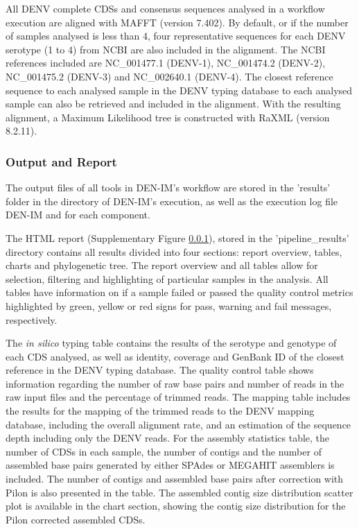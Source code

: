 All DENV complete CDSs and consensus sequences analysed in a workflow execution are aligned with MAFFT \citep{nakamura_parallelization_2018} (version 7.402). By default, or if the number of samples analysed is less than 4, four representative sequences for each DENV serotype (1 to 4) from NCBI are also included in the alignment. The NCBI references included are NC\_001477.1 (DENV-1), NC\_001474.2 (DENV-2), NC\_001475.2 (DENV-3) and NC\_002640.1 (DENV-4). The closest reference sequence to each analysed sample in the DENV typing database to each analysed sample can also be retrieved and included in the alignment. With the resulting alignment, a Maximum Likelihood tree is constructed with RaXML \citep{stamatakis_raxml_2014} (version 8.2.11). 

\subsubsection{Output and Report}

The output files of all tools in DEN-IM’s workflow are stored in the ’results’ folder in the directory of DEN-IM’s execution, as well as the execution log file DEN-IM and for each component. 

The HTML report (Supplementary Figure \ref{}), stored in the ’pipeline\_results’ directory contains all results divided into four sections: report overview, tables, charts and phylogenetic tree. The report overview and all tables allow for selection, filtering and highlighting of particular samples in the analysis. All tables have information on if a sample failed or passed the quality control metrics highlighted by green, yellow or red signs for pass, warning and fail messages, respectively. 

The \textit{in silico} typing table contains the results of the serotype and genotype of each CDS analysed, as well as identity, coverage and GenBank ID of the closest reference in the DENV typing database. The quality control table shows information regarding the number of raw base pairs and number of reads in the raw input files and the percentage of trimmed reads. The mapping table includes the results for the mapping of the trimmed reads to the DENV mapping database, including the overall alignment rate, and an estimation of the sequence depth including only the DENV reads. For the assembly statistics table, the number of CDSs in each sample, the number of contigs and the number of assembled base pairs generated by either SPAdes or MEGAHIT assemblers is included. The number of contigs and assembled base pairs after correction with Pilon is also presented in the table. The assembled contig size distribution scatter plot is available in the chart section, showing the contig size distribution for the Pilon corrected assembled CDSs.

